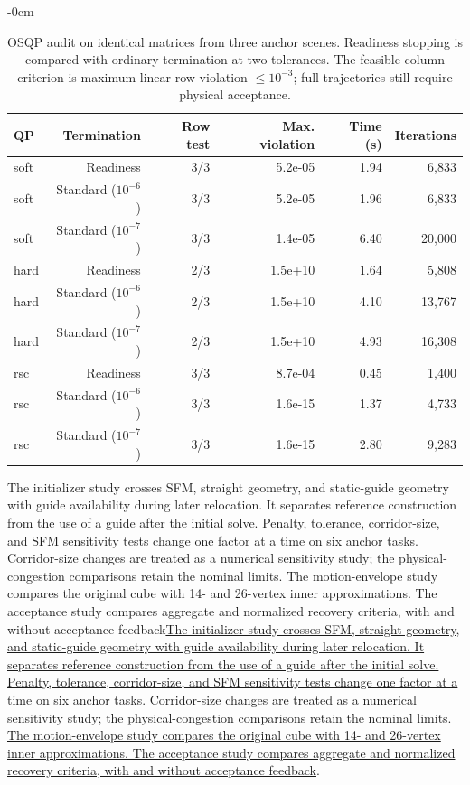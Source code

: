 \documentclass[electronics,article,submit,moreauthors]{Definitions/mdpi}
\providecommand{\DIFadd}[1]{{\protect\color{RevisionBlue}\ifmmode #1\else\uline{#1}\fi}} %
\begin{document}
\begin{table}[htbp]
\begin{adjustwidth}{-\extralength}{0cm}
\begin{mdframed}[linecolor=RevisionBlue,linewidth=.65pt,innerleftmargin=2pt,innerrightmargin=2pt,innertopmargin=3pt,innerbottommargin=3pt]
\color{RevisionBlue}
\setlength{\textwidth}{\linewidth}\setlength{\fulllength}{\linewidth}

\caption{OSQP audit on identical matrices from three anchor scenes. Readiness stopping is compared with ordinary termination at two tolerances. The feasible-column criterion is maximum linear-row violation $\leq10^{-3}$; full trajectories still require physical acceptance.\label{tab:solver-new}}
\centering\small
\begin{tabular}{lrrrrr}\toprule
QP & Termination & Row test & Max. violation & Time (s) & Iterations\\\midrule
soft & Readiness & 3/3 & 5.2e-05 & 1.94 & 6,833\\
soft & Standard ($10^{-6}$) & 3/3 & 5.2e-05 & 1.96 & 6,833\\
soft & Standard ($10^{-7}$) & 3/3 & 1.4e-05 & 6.40 & 20,000\\
hard & Readiness & 2/3 & 1.5e+10 & 1.64 & 5,808\\
hard & Standard ($10^{-6}$) & 2/3 & 1.5e+10 & 4.10 & 13,767\\
hard & Standard ($10^{-7}$) & 2/3 & 1.5e+10 & 4.93 & 16,308\\
rsc & Readiness & 3/3 & 8.7e-04 & 0.45 & 1,400\\
rsc & Standard ($10^{-6}$) & 3/3 & 1.6e-15 & 1.37 & 4,733\\
rsc & Standard ($10^{-7}$) & 3/3 & 1.6e-15 & 2.80 & 9,283\\
\bottomrule\end{tabular}
\end{mdframed}
\end{adjustwidth}
\end{table}



\DIFadd{The initializer study crosses SFM, straight geometry, and static-guide geometry with guide availability during later relocation. It separates reference construction from the use of a guide after the initial solve. Penalty, tolerance, corridor-size, and SFM sensitivity tests change one factor at a time on six anchor tasks. Corridor-size changes are treated as a numerical sensitivity study; the physical-congestion comparisons retain the nominal limits. The motion-envelope study compares the original cube with 14- and 26-vertex inner approximations. The acceptance study compares aggregate and normalized recovery criteria, with and without acceptance feedback}\DIFaddend .
\end{document}
